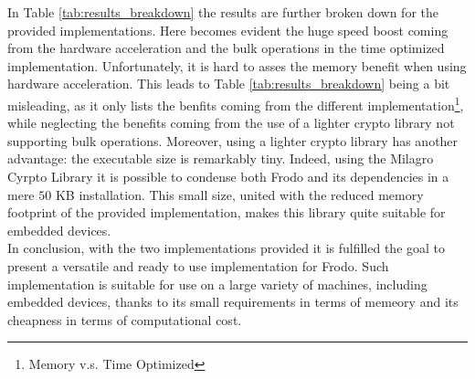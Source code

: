 In Table \ref{tab:results_breakdown} the results are further broken down for the provided implementations. Here becomes evident the huge speed boost coming from the hardware acceleration and the bulk operations in the time optimized implementation. Unfortunately, it is hard to asses the memory benefit when using hardware acceleration. This leads to Table \ref{tab:results_breakdown} being a bit misleading, as it only lists the benfits coming from the different implementation\footnote{Memory v.s. Time Optimized}, while neglecting the benefits coming from the use of a lighter crypto library not supporting bulk operations. Moreover, using a lighter crypto library has another advantage: the executable size is remarkably tiny. Indeed, using the Milagro Cyrpto Library it is possible to condense both Frodo and its dependencies in a mere $50$ KB installation. This small size, united with the reduced memory footprint of the provided implementation, makes this library quite suitable for embedded devices.\\
In conclusion, with the two implementations provided it is fulfilled the goal to present a versatile and ready to use implementation for Frodo. Such implementation is suitable for use on a large variety of machines, including embedded devices, thanks to its small requirements in terms of memeory and its cheapness in terms of computational cost.


